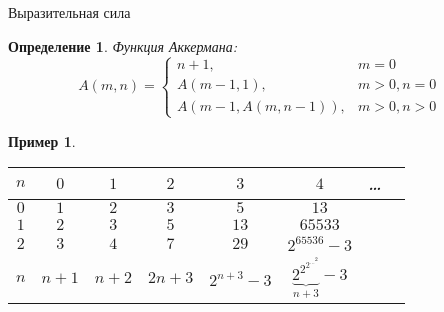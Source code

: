 \documentclass[handout]{beamer}
\newtheorem{thm}{Теорема}[section]
\newtheorem{dfn}{Определение}[section]
\newtheorem{exm}{Пример}[section]
\begin{document}
\begin{frame}{Выразительная сила}
\begin{dfn}
Функция Аккермана:
$$A(m,n) = \left\{\begin{array}{ll}
  n+1,&m = 0\\
  A(m-1,1),&m > 0, n = 0\\
  A(m-1,A(m,n-1)),&m > 0, n > 0
\end{array}\right.$$
\end{dfn}


\begin{exm}
\begin{tabular}{cccccccc}
$n$ & $0$ & $1$ & $2$ & $3$ & $4$ & \dots \\\hline
$0$ & $1$ & $2$ & $3$ & $5$ & $13$   \\
$1$ & $2$ & $3$ & $5$ & $13$ & $65533$ \\
$2$ & $3$ & $4$ & $7$ & $29$ & $2^{65536}-3$ \\
$n$ & $n+1$ & $n+2$ & $2n+3$ & $2^{n+3}-3$ & $\underbrace{2^{2^{2^{\dots^2}}}}_{n+3}-3$
\end{tabular}
\end{exm}
\end{frame}
\end{document}
